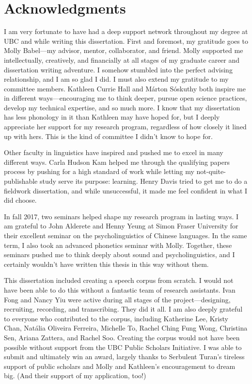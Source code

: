 
\chapter{Acknowledgments}

I am very fortunate to have had a deep support network throughout my degree at UBC and while writing this dissertation. First and foremost, my gratitude goes to Molly Babel---my advisor, mentor, collaborator, and friend. Molly supported me intellectually, creatively, and financially at all stages of my graduate career and dissertation writing adventure. I somehow stumbled into the perfect advising relationship, and I am so glad I did. I must also extend my gratitude to my committee members. Kathleen Currie Hall and Márton Sóskuthy both inspire me in different ways---encouraging me to think deeper, pursue open science practices, develop my technical expertise, and so much more. I know that my dissertation has less phonology in it than Kathleen may have hoped for, but I deeply appreciate her support for my research program, regardless of how closely it lined up with hers. This is the kind of committee I didn't know to hope for. 

Other faculty in linguistics have inspired and pushed me to excel in many different ways. Carla Hudson Kam helped me through the qualifying papers process by pushing for a high standard of work while letting my not-quite-publishable study serve its purpose: learning. Henry Davis tried to get me to do a fieldwork dissertation, and while unsuccessful, it made me feel confident in what I did choose. 

In fall 2017, two seminars helped shape my research program in lasting ways. I am grateful to John Alderete and Henny Yeung at Simon Fraser University for their excellent seminar on the psycholinguistics of Chinese languages. In the same term, I also took an advanced phonetics seminar with Molly. Together, these seminars pushed me to think deeply about sound and psycholinguistics, and I certainly wouldn't have written this thesis in this way without them.

This dissertation included creating a speech corpus from scratch. I would not have been able to do this without a fantastic team of research assistants. Ivan Fong and Nancy Yiu were active during all stages of the project---designing, recruiting, recording, and transcribing. They did it all. I am also deeply grateful to everyone who contributed to the corpus, including Katherine Lee, Kristy Chan, Natália Oliveira Ferreira, Michelle To, Rachel Ching Fung Wong, Christina Sen, Ariana Zattera, and Rachel Soo. Creating the corpus would not have been possible without support from the UBC Public Scholars Initiative. I was able to submit and ultimately win an award, largely thanks to Serbulent Turan's tireless support of public scholars and Molly and Kathleen's encouragement to dream big. (And their support of my application, too!)

